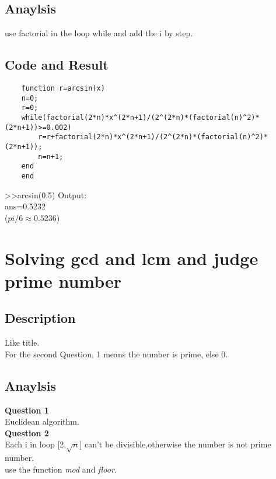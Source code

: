 \documentclass[UTF8,a4paper]{article}
\begin{document}
\subsection{Anaylsis}
use factorial in the loop while and add the i by step.
\subsection{Code and Result}
\begin{lstlisting}
    function r=arcsin(x)
    n=0;
    r=0;
    while(factorial(2*n)*x^(2*n+1)/(2^(2*n)*(factorial(n)^2)*(2*n+1))>=0.002)
        r=r+factorial(2*n)*x^(2*n+1)/(2^(2*n)*(factorial(n)^2)*(2*n+1));
        n=n+1;
    end
    end    
\end{lstlisting}
>>arcsin(0.5)
Output:\\
    ans=0.5232\\
($pi/6\approx 0.5236$)
\section{Solving gcd and lcm and judge prime number}
\subsection{Description}

\noindent Like title.\\
For the second Question, 1 means the number is prime, else 0.
\subsection{Anaylsis}
\textbf{Question 1} \\
Euclidean algorithm.\\
\textbf{Question 2}\\
Each i in loop [2,$\sqrt{n}$] can't be divisible,otherwise the number is not prime number.\\
use the function \textit{mod} and \textit{floor}.
\end{document}
